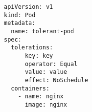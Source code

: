 \begin{verbatim}
apiVersion: v1
kind: Pod
metadata:
  name: tolerant-pod
spec:
  tolerations:
    - key: key
      operator: Equal
      value: value
      effect: NoSchedule
  containers:
    - name: nginx
      image: nginx

\end{verbatim}